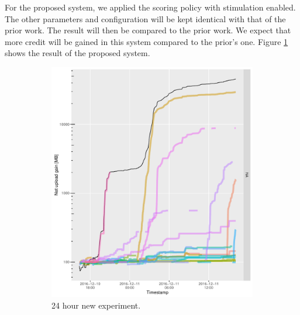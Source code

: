For the proposed system, we applied the scoring policy with stimulation enabled. The other parameters and configuration will be kept identical with that of the prior work. The result will then be compared to the prior work. We expect that more credit will be gained in this system compared to the prior's one. Figure \ref{fig:newetree24} shows the result of the proposed system. 


\begin{figure}[h]
	\begin{adjustwidth}{-1.5cm}{}
		\begin{subfigure}[t]{0.6\textwidth}
			\centering
			\includegraphics[width=\textwidth]{pics/results/b136.pdf}
			\caption{24 hour new experiment.}
			\label{fig:newetree24}
		\end{subfigure}
		~
		\begin{subfigure}[t]{0.6\textwidth}
			\centering

\end{subfigure}
\end{adjustwidth}
\end{figure}
